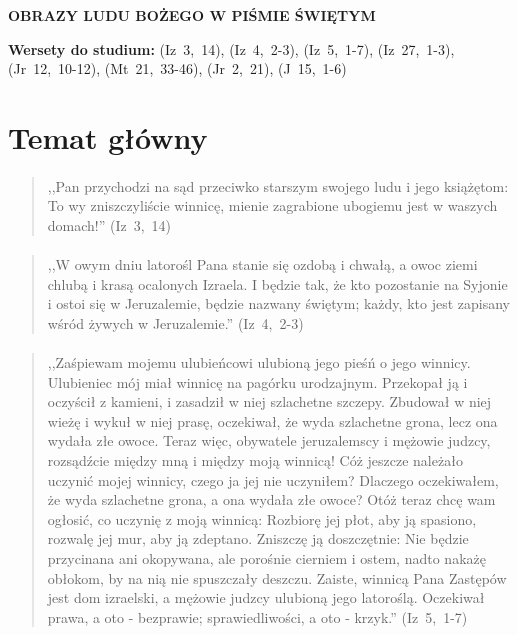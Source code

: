 \documentclass[10pt,a4paper,oneside]{article}
\begin{document}
\centerline{\textbf{\MakeUppercase{Obrazy Ludu Bożego w Piśmie Świętym}}}
\begin{center}
\textbf{Wersety do studium:} \mbox{(Iz 3, 14)}, \mbox{(Iz 4, 2-3)}, \mbox{(Iz 5, 1-7)}, \mbox{(Iz 27, 1-3)}, \mbox{(Jr 12, 10-12)}, \mbox{(Mt 21, 33-46)}, \mbox{(Jr 2, 21)}, \mbox{(J 15, 1-6)}
\end{center}
\section{Temat główny}
\paragraph{}
\begin{quote}
,,Pan przychodzi na sąd przeciwko starszym swojego ludu i jego książętom: To wy zniszczyliście winnicę, mienie zagrabione ubogiemu jest w waszych domach!'' \mbox{(Iz 3, 14)}
\end{quote}
\paragraph{}
\begin{quote}
,,W owym dniu latorośl Pana stanie się ozdobą i chwałą, a owoc ziemi chlubą i krasą ocalonych Izraela. I będzie tak, że kto pozostanie na Syjonie i ostoi się w Jeruzalemie, będzie nazwany świętym; każdy, kto jest zapisany wśród żywych w Jeruzalemie.'' \mbox{(Iz 4, 2-3)}
\end{quote}
\paragraph{}
\begin{quote}
,,Zaśpiewam mojemu ulubieńcowi ulubioną jego pieśń o jego winnicy. Ulubieniec mój miał winnicę na pagórku urodzajnym. Przekopał ją i oczyścił z kamieni, i zasadził w niej szlachetne szczepy. Zbudował w niej wieżę i wykuł w niej prasę, oczekiwał, że wyda szlachetne grona, lecz ona wydała złe owoce. Teraz więc, obywatele jeruzalemscy i mężowie judzcy, rozsądźcie między mną i między moją winnicą! Cóż jeszcze należało uczynić mojej winnicy, czego ja jej nie uczyniłem? Dlaczego oczekiwałem, że wyda szlachetne grona, a ona wydała złe owoce? Otóż teraz chcę wam ogłosić, co uczynię z moją winnicą: Rozbiorę jej płot, aby ją spasiono, rozwalę jej mur, aby ją zdeptano. Zniszczę ją doszczętnie: Nie będzie przycinana ani okopywana, ale porośnie cierniem i ostem, nadto nakażę obłokom, by na nią nie spuszczały deszczu. Zaiste, winnicą Pana Zastępów jest dom izraelski, a mężowie judzcy ulubioną jego latoroślą. Oczekiwał prawa, a oto - bezprawie; sprawiedliwości, a oto - krzyk.'' \mbox{(Iz 5, 1-7)}
\end{quote}
\end{document}
